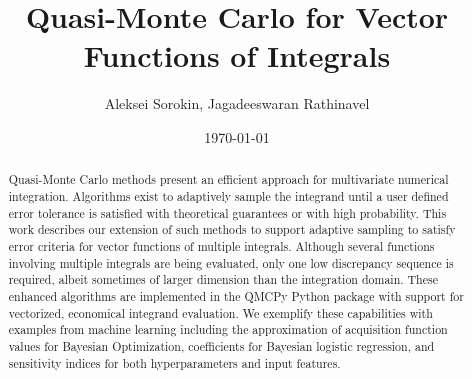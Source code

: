 \documentclass{article}[12pt]
\title{Quasi-Monte Carlo for Vector Functions of Integrals}
\author{Aleksei Sorokin, Jagadeeswaran Rathinavel}
\date{\today}
\begin{document}
\maketitle

\begin{abstract}
Quasi-Monte Carlo methods present an efficient approach for multivariate numerical integration. Algorithms exist to adaptively sample the integrand until a user defined error tolerance is satisfied with theoretical guarantees or with high probability. This work describes our extension of such methods to support adaptive sampling to satisfy error criteria for vector functions of multiple integrals. Although several functions involving multiple integrals are being evaluated, only one low discrepancy sequence is required, albeit sometimes of larger dimension than the integration domain. These enhanced algorithms are implemented in the QMCPy Python package with support for vectorized, economical integrand evaluation. We exemplify these capabilities with examples from machine learning including the approximation of acquisition function values for Bayesian Optimization, coefficients for Bayesian logistic regression, and sensitivity indices for both hyperparameters and input features.
\end{abstract}

\tableofcontents

\newpage 


\newpage
\end{document}
